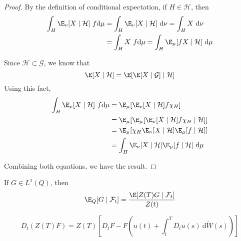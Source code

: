 \begin{proof}

	By the definition of conditional expectation, if $H \in \mathcal{H}$, then 
	\begin{equation}
	\begin{aligned}
		\int_H \E_\nu [X \mid \mathcal{H}] ~f\mathrm{d}\mu &= \int_H \E_\nu [X \mid \mathcal{H}] ~\mathrm{d}\nu = \int_H X ~\mathrm{d}\nu \\
									   &= \int_H X ~f\mathrm{d}\mu = \int_H \E_\mu [f X \mid \mathcal{H}] ~\mathrm{d}\mu
	\end{aligned}
	\end{equation}

	Since $\mathcal{H} \subset \mathcal{G}$, we know that 
	\[
		\E[X \mid \mathcal{H}] = \E[\E[X \mid \mathcal{G}] \mid \mathcal{H}]
	\]
	Using this fact, 
	\begin{equation}
	\begin{aligned}
		\int_H \E_\nu [X \mid \mathcal{H}] ~f\mathrm{d}\mu &= \E_\mu [\E_\nu[X \mid \mathcal{H}] f \chi_H] \\
										&= \E_\mu[\E_\mu[\E_\nu[X \mid \mathcal{H}] f \chi_H \mid \mathcal{H}]] \\
									   &= \E_\mu[\chi_H \E_\nu[X \mid \mathcal{H}] \E_\mu [f \mid \mathcal{H}]] \\
									   &= \int_H \E_\nu [X \mid \mathcal{H}] \E_\mu [f \mid \mathcal{H}] ~\mathrm{d}\mu 
	\end{aligned}
	\end{equation}

	Combining both equations, we have the result.
\end{proof}

\begin{corollary}\label{cor:202401150945}
If $G \in L^1(Q)$, then 
\begin{equation}
	\E_Q [G \mid \mathcal{F}_t] = \frac{\E[Z(T)G \mid \mathcal{F}_t]}{Z(t)}
\end{equation}
\end{corollary}

\begin{lemma}\label{lm:202401151023}
\begin{equation}
	D_t(Z(T)F) = Z(T) \left[ D_t F - F \left( u(t) + \int_t^T D_t u(s) ~\mathrm{d}\widetilde{W}(s) \right) \right]
\end{equation}
\end{lemma}

